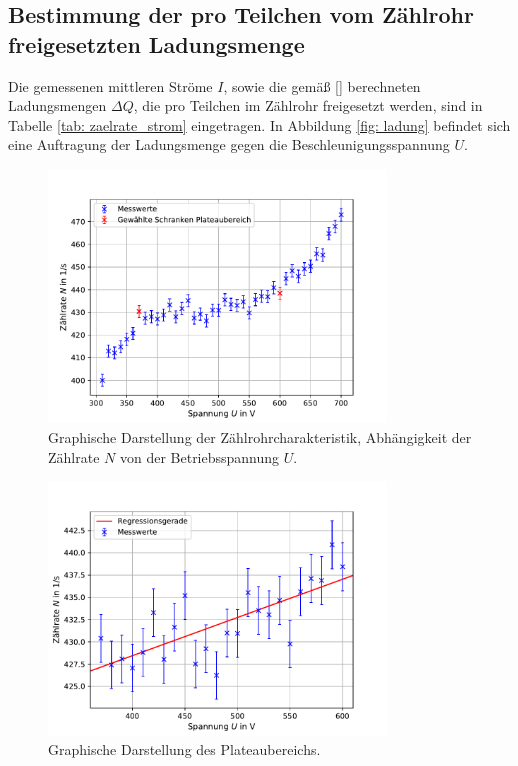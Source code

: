 \subsection{Bestimmung der pro Teilchen vom Zählrohr freigesetzten Ladungsmenge}
Die gemessenen mittleren Ströme $I$, sowie die gemäß \eqref{} berechneten Ladungsmengen $\Delta Q$, die pro %
Teilchen im Zählrohr freigesetzt werden, sind in Tabelle \ref{tab: zaelrate_strom} eingetragen. In Abbildung
\ref{fig: ladung} befindet sich eine Auftragung der Ladungsmenge gegen die Beschleunigungsspannung $U$.


\newpage

\begin{figure}
  \centering
  \includegraphics[width = 0.8\textwidth]{../Messdaten/plots/all_counts.pdf}
  \caption{Graphische Darstellung der Zählrohrcharakteristik, Abhängigkeit der Zählrate $N$ von der Betriebsspannung $U$.}
  \label{fig: zählrate_ges}
\end{figure}
\begin{figure}
  \centering
  \includegraphics[width = 0.8\textwidth]{../Messdaten/plots/plateau.pdf}
  \caption{Graphische Darstellung des Plateaubereichs.}
  \label{fig: plateau}
\end{figure}
